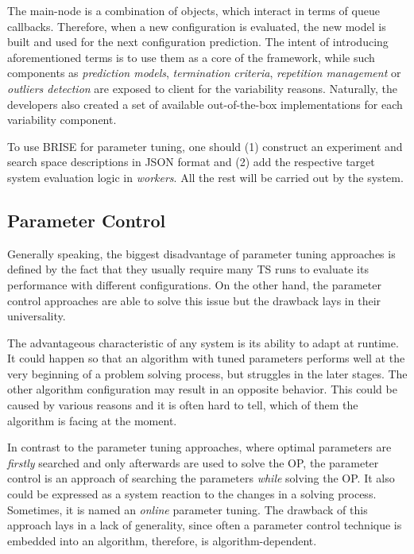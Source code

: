 The main-node is a combination of objects, which interact in terms of queue callbacks. Therefore, when a new configuration is evaluated, the new model is built and used for the next configuration prediction. The intent of introducing aforementioned terms is to use them as a core of the framework, while such components as \emph{prediction models}, \emph{termination criteria}, \emph{repetition management} or \emph{outliers detection} are exposed to client for the variability reasons. Naturally, the developers also created a set of available out-of-the-box implementations for each variability component.

To use BRISE for parameter tuning, one should (1) construct an experiment and search space descriptions in JSON format and (2) add the respective target system evaluation logic in \emph{workers}. All the rest will be carried out by the system.


\subsection{Parameter Control}\label{bg: parameter control}
Generally speaking, the biggest disadvantage of parameter tuning approaches is defined by the fact that they usually require many TS runs to evaluate its performance with different configurations. On the other hand, the parameter control approaches are able to solve this issue but the drawback lays in their universality.

The advantageous characteristic of any system is its ability to adapt at runtime.
It could happen so that an algorithm with tuned parameters performs well at the very beginning of a problem solving process, but struggles in the later stages. The other algorithm configuration may result in an opposite behavior. This could be caused by various reasons and it is often hard to tell, which of them the algorithm is facing at the moment. 

In contrast to the parameter tuning approaches, where optimal parameters are \emph{firstly} searched and only afterwards are used to solve the OP, the parameter control is an approach of searching the parameters \emph{while} solving the OP. It also could be expressed as a system reaction to the changes in a solving process. Sometimes, it is named an \emph{online} parameter tuning. The drawback of this approach lays in a lack of generality, since often a parameter control technique is embedded into an algorithm, therefore, is algorithm-dependent.


